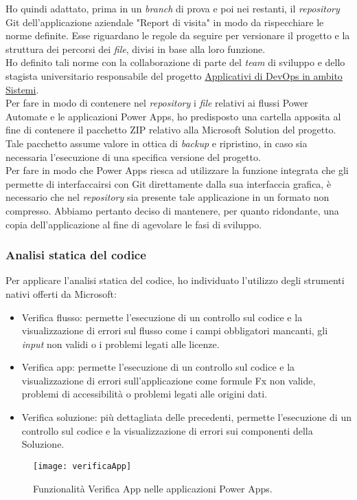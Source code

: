 Ho quindi adattato, prima in un \emph{branch} di prova e poi nei restanti, il \emph{repository} Git dell'applicazione aziendale "Report di visita" in modo da rispecchiare le norme definite.
Esse riguardano le regole da seguire per versionare il progetto e la struttura dei percorsi dei \emph{file}, divisi in base alla loro funzione.\\  
Ho definito tali norme con la collaborazione di parte del \emph{team} di sviluppo e dello stagista universitario responsabile del progetto \hyperref[stageDavide]{Applicativi di DevOps in ambito Sistemi}.\\ 
Per fare in modo di contenere nel \emph{repository} i \emph{file} relativi ai flussi Power Automate e le applicazioni Power Apps, ho predisposto una cartella apposita al fine di contenere il pacchetto ZIP relativo alla Microsoft Solution del progetto.\\ 
Tale pacchetto assume valore in ottica di \emph{backup} e ripristino, in caso sia necessaria l'esecuzione di una specifica versione del progetto.\\  
Per fare in modo che Power Apps riesca ad utilizzare la funzione integrata che gli permette di interfaccairsi con Git direttamente dalla sua interfaccia grafica, è necessario che nel \emph{repository} sia presente tale applicazione in un formato non compresso.
Abbiamo pertanto deciso di mantenere, per quanto ridondante, una copia dell'applicazione al fine di agevolare le fasi di sviluppo.\\ 

\subsubsection*{Analisi statica del codice}
Per applicare l'analisi statica del codice, ho individuato l'utilizzo degli strumenti nativi offerti da Microsoft:
\begin{itemize}
    \item Verifica flusso: permette l'esecuzione di un controllo sul codice e la visualizzazione di errori sul flusso come i campi obbligatori mancanti, gli \emph{input} non validi o i problemi legati alle licenze. 
    \item Verifica app: permette l'esecuzione di un controllo sul codice e la visualizzazione di errori sull'applicazione come formule Fx non valide, problemi di accessibilità o problemi legati alle origini dati. 
    \item Verifica soluzione: più dettagliata delle precedenti, permette l'esecuzione di un controllo sul codice e la visualizzazione di errori sui componenti della Soluzione.
\end{itemize}
\begin{figure}[htbp] 
    \centering 
    \texttt{[image: verificaApp]} 
    \caption{Funzionalità Verifica App nelle applicazioni Power Apps.}
    \label{fig:verificaApp}
\end{figure}

